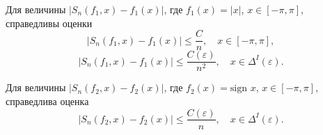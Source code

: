 
\begin{lemma} \label{lemma_Sn_f1}
	Для величины $|S_n(f_1,x) - f_1(x)|$, где $f_1(x) = |x|$, $x \in [-\pi,\pi]$, справедливы оценки
	\begin{equation} \label{Sn1 -pi pi}
		|S_n(f_1,x) - f_1(x)| \leq \frac{C}{n}, \quad x \in [-\pi, \pi],
	\end{equation}
	\begin{equation} \label{Sn1 eps pi - eps}
		|S_n(f_1,x) - f_1(x)| \leq \frac{C(\varepsilon)}{n^2}, \quad x \in \Delta^I(\varepsilon).
	\end{equation}
\end{lemma}
\begin{lemma} \label{lemma_Sn_f2}
	Для величины $|S_n(f_2,x) - f_2(x)|$, где $f_2(x) = \mbox{sign } x$, $x \in [-\pi,\pi]$, справедлива оценка
	\begin{equation*}
		|S_n(f_2,x) - f_2(x)| \leq \frac{C(\varepsilon)}{n}, \quad x \in \Delta^I(\varepsilon). \label{Sn2 eps pi - eps}
	\end{equation*}
\end{lemma}

